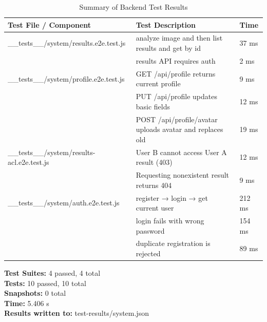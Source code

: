 \begin{table}[h!]
    \centering
    \caption{Summary of Backend Test Results}

    \begin{tabularx}{\textwidth}{lXl}
        \toprule
        \textbf{Test File / Component}               & \textbf{Test Description}                                & \textbf{Time} \\
        \midrule
        \_\_tests\_\_/system/results.e2e.test.js     & analyze image and then list results and get by id        & 37 ms         \\
                                                     & results API requires auth                                & 2 ms          \\
        \midrule
        \_\_tests\_\_/system/profile.e2e.test.js     & GET /api/profile returns current profile                 & 9 ms          \\
                                                     & PUT /api/profile updates basic fields                    & 12 ms         \\
                                                     & POST /api/profile/avatar uploads avatar and replaces old & 19 ms         \\
        \midrule
        \_\_tests\_\_/system/results-acl.e2e.test.js & User B cannot access User A result (403)                 & 12 ms         \\
                                                     & Requesting nonexistent result returns 404                & 9 ms          \\
        \midrule
        \_\_tests\_\_/system/auth.e2e.test.js        & register → login → get current user                      & 212 ms        \\
                                                     & login fails with wrong password                          & 154 ms        \\
                                                     & duplicate registration is rejected                       & 89 ms         \\
        \bottomrule
    \end{tabularx}

\end{table}

\noindent
\textbf{Test Suites:} 4 passed, 4 total \\
\textbf{Tests:} 10 passed, 10 total \\
\textbf{Snapshots:} 0 total \\
\textbf{Time:} 5.406 s \\
\textbf{Results written to:} test-results/system.json

